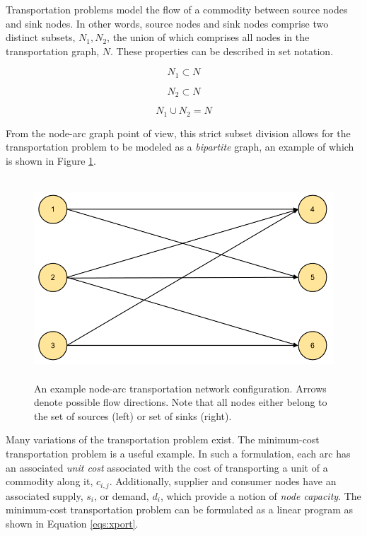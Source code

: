 Transportation problems model the flow of a commodity between source nodes and
sink nodes. In other words, source nodes and sink nodes comprise two distinct
subsets, $N_1, N_2$, the union of which comprises all nodes in the
transportation graph, $N$. These properties can be described in set notation.

\begin{equation}
  N_1 \subset N
\end{equation}

\begin{equation}
 N_2 \subset N
\end{equation}

\begin{equation}
  N_1 \cup N_2 = N
\end{equation}

From the node-arc graph point of view, this strict subset division allows for
the transportation problem to be modeled as a \textit{bipartite} graph, an
example of which is shown in Figure \ref{fig:node-arcs-bipartite}.

\begin{figure}[H]
  \begin{center}
    \includegraphics[height=7.5cm]{./chapters/1-intro/figs/node-arcs-bipartite.png}
  \caption{An example node-arc transportation network configuration. Arrows
    denote possible flow directions. Note that all nodes either belong to the 
    set of sources (left) or set of sinks (right).}
  \label{fig:node-arcs-bipartite}
  \end{center}
\end{figure}

Many variations of the transportation problem exist. The minimum-cost
transportation problem is a useful example. In such a formulation, each arc has
an associated \textit{unit cost} associated with the cost of transporting a unit
of a commodity along it, $c_{i,j}$. Additionally, supplier and consumer nodes
have an associated supply, $s_i$, or demand, $d_i$, which provide a notion of
\textit{node capacity}. The minimum-cost transportation problem can be
formulated as a linear program as shown in Equation \ref{eqs:xport}.

